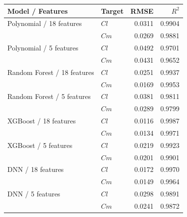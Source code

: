 \begin{tabular}{llrr}
\toprule
Model / Features & Target & RMSE & $R^2$ \\ \midrule
Polynomial / 18 features & $Cl$ & 0.0311 & 0.9904 \\
 & $Cm$ & 0.0269 & 0.9881 \\
Polynomial / 5 features & $Cl$ & 0.0492 & 0.9701 \\
 & $Cm$ & 0.0431 & 0.9652 \\
Random Forest / 18 features & $Cl$ & 0.0251 & 0.9937 \\
 & $Cm$ & 0.0169 & 0.9953 \\
Random Forest / 5 features & $Cl$ & 0.0381 & 0.9811 \\
 & $Cm$ & 0.0289 & 0.9799 \\
XGBoost / 18 features & $Cl$ & 0.0116 & 0.9987 \\
 & $Cm$ & 0.0134 & 0.9971 \\
XGBoost / 5 features & $Cl$ & 0.0219 & 0.9923 \\
 & $Cm$ & 0.0201 & 0.9901 \\
DNN / 18 features & $Cl$ & 0.0172 & 0.9970 \\
 & $Cm$ & 0.0149 & 0.9964 \\
DNN / 5 features & $Cl$ & 0.0298 & 0.9891 \\
 & $Cm$ & 0.0241 & 0.9872 \\
\bottomrule
\end{tabular}